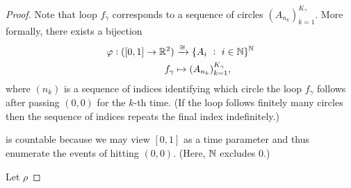 \begin{enumerate}[label=(\alph*)]
\begin{proof}
    Note that loop $f_\gamma$ corresponds to a sequence of circles $(A_{n_k})_{k=1}^{K_\gamma}$. More formally,
    there exists a bijection
    \begin{align*}
      \varphi:([0, 1] \to \mathbb{R}^2) &\xrightarrow{\rm \cong} \{A_i ~:~ i \in \mathbb{N}\}^{\mathbb{N}} \\
      f_\gamma &\mapsto (A_{n_k})_{k=1}^{K_\gamma},
    \end{align*}
    where $(n_k)$ is a sequence of indices identifying which circle the loop $f_\gamma$ follows after
    passing $(0, 0)$ for the $k$-th time. (If the loop follows finitely many circles then the sequence of
    indices repeats the final index indefinitely.)






    is countable because we may view $[0, 1]$ as a time parameter and thus enumerate the events of
    hitting $(0, 0)$. (Here, $\mathbb{N}$ excludes $0$.)

    Let $\rho$


  \end{proof}

\end{enumerate}

